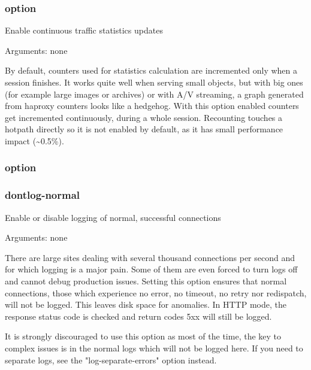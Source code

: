 \subsubsection[contstats]{option }


  Enable continuous traffic statistics updates


  Arguments: none

  By default, counters used for statistics calculation are incremented
  only when a session finishes. It works quite well when serving small
  objects, but with big ones (for example large images or archives) or
  with A/V streaming, a graph generated from haproxy counters looks like
  a hedgehog. With this option enabled counters get incremented continuously,
  during a whole session. Recounting touches a hotpath directly so
  it is not enabled by default, as it has small performance impact (\~{}0.5\%).

\subsubsection[dontlog-normal]{option }
\subsubsection*{dontlog-normal}


  Enable or disable logging of normal, successful connections


  Arguments: none

  There are large sites dealing with several thousand connections per second
  and for which logging is a major pain. Some of them are even forced to turn
  logs off and cannot debug production issues. Setting this option ensures that
  normal connections, those which experience no error, no timeout, no retry nor
  redispatch, will not be logged. This leaves disk space for anomalies. In HTTP
  mode, the response status code is checked and return codes 5xx will still be
  logged.

  It is strongly discouraged to use this option as most of the time, the key to
  complex issues is in the normal logs which will not be logged here. If you
  need to separate logs, see the "log-separate-errors" option instead.

